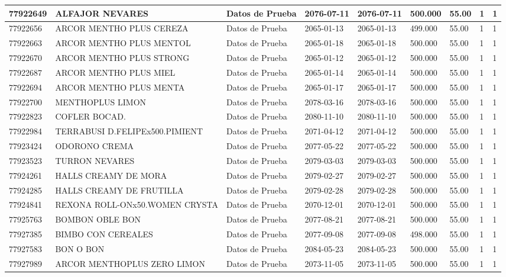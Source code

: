 \documentclass[a4paper,12pt]{article}
\begin{document}
\begin{landscape}
\begin{longtable}{|p{4cm}|p{2.5cm}|p{2.5cm}|p{1.8cm}|p{1.8cm}|p{1cm}|p{1cm}|p{3cm}|p{3cm}||}
77922649 & ALFAJOR NEVARES & Datos de Prueba & 2076-07-11 & 2076-07-11 & 500.000 & 55.00 & 1 & 1 \\ \hline 
77922656 & ARCOR MENTHO PLUS CEREZA & Datos de Prueba & 2065-01-13 & 2065-01-13 & 499.000 & 55.00 & 1 & 1 \\ \hline 
77922663 & ARCOR MENTHO PLUS MENTOL & Datos de Prueba & 2065-01-18 & 2065-01-18 & 500.000 & 55.00 & 1 & 1 \\ \hline 
77922670 & ARCOR MENTHO PLUS STRONG & Datos de Prueba & 2065-01-12 & 2065-01-12 & 500.000 & 55.00 & 1 & 1 \\ \hline 
77922687 & ARCOR MENTHO PLUS MIEL & Datos de Prueba & 2065-01-14 & 2065-01-14 & 500.000 & 55.00 & 1 & 1 \\ \hline 
77922694 & ARCOR MENTHO PLUS MENTA & Datos de Prueba & 2065-01-17 & 2065-01-17 & 500.000 & 55.00 & 1 & 1 \\ \hline 
77922700 & MENTHOPLUS LIMON & Datos de Prueba & 2078-03-16 & 2078-03-16 & 500.000 & 55.00 & 1 & 1 \\ \hline 
77922823 & COFLER BOCAD. & Datos de Prueba & 2080-11-10 & 2080-11-10 & 500.000 & 55.00 & 1 & 1 \\ \hline 
77922984 & TERRABUSI D.FELIPEx500.PIMIENT & Datos de Prueba & 2071-04-12 & 2071-04-12 & 500.000 & 55.00 & 1 & 1 \\ \hline 
77923424 & ODORONO CREMA & Datos de Prueba & 2077-05-22 & 2077-05-22 & 500.000 & 55.00 & 1 & 1 \\ \hline 
77923523 & TURRON NEVARES & Datos de Prueba & 2079-03-03 & 2079-03-03 & 500.000 & 55.00 & 1 & 1 \\ \hline 
77924261 & HALLS CREAMY DE MORA & Datos de Prueba & 2079-02-27 & 2079-02-27 & 500.000 & 55.00 & 1 & 1 \\ \hline 
77924285 & HALLS CREAMY DE FRUTILLA & Datos de Prueba & 2079-02-28 & 2079-02-28 & 500.000 & 55.00 & 1 & 1 \\ \hline 
77924841 & REXONA ROLL-ONx50.WOMEN CRYSTA & Datos de Prueba & 2070-12-01 & 2070-12-01 & 500.000 & 55.00 & 1 & 1 \\ \hline 
77925763 & BOMBON OBLE BON & Datos de Prueba & 2077-08-21 & 2077-08-21 & 500.000 & 55.00 & 1 & 1 \\ \hline 
77927385 & BIMBO CON CEREALES & Datos de Prueba & 2077-09-08 & 2077-09-08 & 498.000 & 55.00 & 1 & 1 \\ \hline 
77927583 & BON O BON & Datos de Prueba & 2084-05-23 & 2084-05-23 & 500.000 & 55.00 & 1 & 1 \\ \hline 
77927989 & ARCOR MENTHOPLUS ZERO LIMON & Datos de Prueba & 2073-11-05 & 2073-11-05 & 500.000 & 55.00 & 1 & 1 \\ \hline 

\end{longtable}
\end{landscape}
\end{document}
